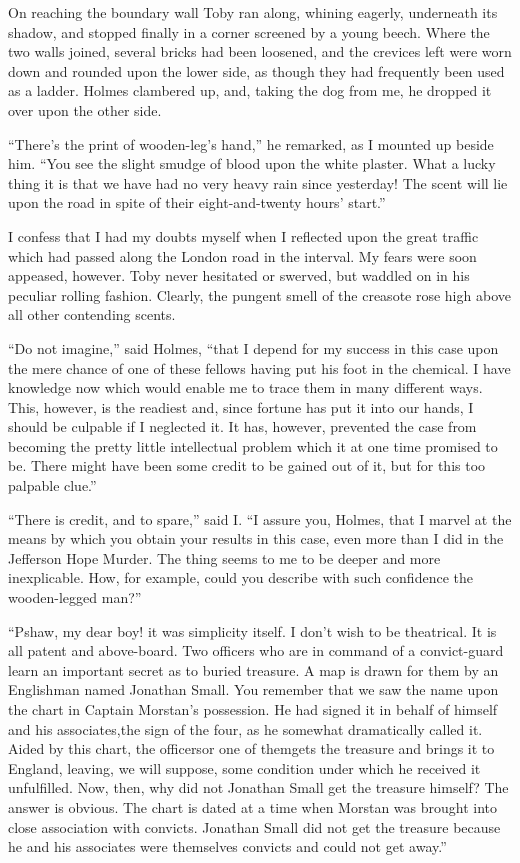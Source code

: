 \documentclass[12pt,english,oneside]{book}
\begin{document}
On reaching the boundary wall Toby ran along, whining eagerly, underneath
its shadow, and stopped finally in a corner screened by a young beech.
Where the two walls joined, several bricks had been loosened, and
the crevices left were worn down and rounded upon the lower side,
as though they had frequently been used as a ladder. Holmes clambered
up, and, taking the dog from me, he dropped it over upon the other
side.

{}``There's the print of wooden-leg's hand,'' he remarked, as I
mounted up beside him. {}``You see the slight smudge of blood upon
the white plaster. What a lucky thing it is that we have had no very
heavy rain since yesterday! The scent will lie upon the road in spite
of their eight-and-twenty hours' start.''

I confess that I had my doubts myself when I reflected upon the great
traffic which had passed along the London road in the interval. My
fears were soon appeased, however. Toby never hesitated or swerved,
but waddled on in his peculiar rolling fashion. Clearly, the pungent
smell of the creasote rose high above all other contending scents.

{}``Do not imagine,'' said Holmes, {}``that I depend for my success
in this case upon the mere chance of one of these fellows having put
his foot in the chemical. I have knowledge now which would enable
me to trace them in many different ways. This, however, is the readiest
and, since fortune has put it into our hands, I should be culpable
if I neglected it. It has, however, prevented the case from becoming
the pretty little intellectual problem which it at one time promised
to be. There might have been some credit to be gained out of it, but
for this too palpable clue.''

{}``There is credit, and to spare,'' said I. {}``I assure you,
Holmes, that I marvel at the means by which you obtain your results
in this case, even more than I did in the Jefferson Hope Murder. The
thing seems to me to be deeper and more inexplicable. How, for example,
could you describe with such confidence the wooden-legged man?''

{}``Pshaw, my dear boy! it was simplicity itself. I don't wish to
be theatrical. It is all patent and above-board. Two officers who
are in command of a convict-guard learn an important secret as to
buried treasure. A map is drawn for them by an Englishman named Jonathan
Small. You remember that we saw the name upon the chart in Captain
Morstan's possession. He had signed it in behalf of himself and his
associates,\mdsh{---}the sign of the four, as he somewhat dramatically
called it. Aided by this chart, the officers\mdsh{---}or one of them\mdsh{---}gets
the treasure and brings it to England, leaving, we will suppose, some
condition under which he received it unfulfilled. Now, then, why did
not Jonathan Small get the treasure himself? The answer is obvious.
The chart is dated at a time when Morstan was brought into close association
with convicts. Jonathan Small did not get the treasure because he
and his associates were themselves convicts and could not get away.''
\end{document}

